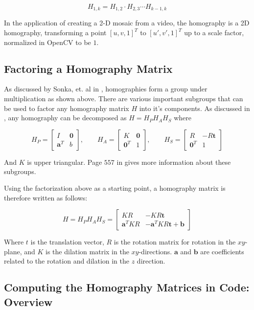 \documentclass{article}
\begin{document}
\[H_{1, k} = H_{1, 2} \cdot H_{2, 3} \cdots H_{k - 1, k}\]

In the application of creating a 2-D mosaic from a video, the homography is a
2D homography, transforming a point $[u, v, 1]^T$ to $[u', v', 1]^T$ up to a
scale factor, normalized in OpenCV to be $1$. 

\subsection{Factoring a Homography Matrix}
\label{factoring}

As discussed by Sonka, et. al in \cite{sonkatext}, homographies form a group
under multiplication as shown above. There are various important subgroups that
can be used to factor any homography matrix $H$ into it's components. As
discussed in \cite{sonkatext}, any homography can be decomposed as $H = H_P H_A H_S$ where 

\[
H_P = \begin{bmatrix} I & \mathbf{0} \\ \mathbf{a}^T & b \end{bmatrix}, \qquad
H_A = \begin{bmatrix} K & \mathbf{0} \\ \mathbf{0}^T & 1 \end{bmatrix}, \qquad
H_S = \begin{bmatrix} R & -R\mathbf{t} \\ \mathbf{0}^T & 1 \end{bmatrix}
\] 

And $K$ is upper triangular. Page $557$ in \cite{sonkatext} gives more
information about these subgroups. 

Using the factorization above as a starting point, a homography matrix is
therefore written as follows:

\[H = H_P H_A H_S = \begin{bmatrix}KR & -KR\mathbf{t} \\ \mathbf{a}^TKR &
 -\mathbf{a}^TKR\mathbf{t} + \mathbf{b} \end{bmatrix}\] 

Where $t$ is the translation vector, $R$ is the rotation matrix for rotation in
the $xy$-plane, and $K$ is the dilation matrix in the $xy$-directions.
$\mathbf{a}$ and $\mathbf{b}$ are coefficients related to the rotation and
dilation in the $z$ direction.

\subsection{Computing the Homography Matrices in Code: Overview}
\end{document}
